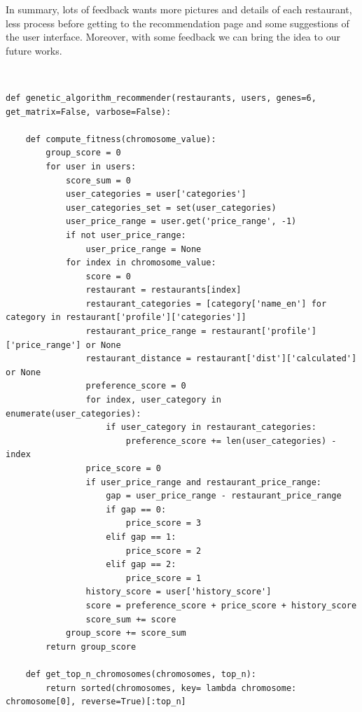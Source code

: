 \documentclass[12pt,oneside,openright,a4paper]{cpe-english-project}
\begin{document}
In summary, lots of feedback wants more pictures and details of each restaurant, less process before getting to the recommendation page and some suggestions of the user interface. Moreover, with some feedback we can bring the idea to our future works.


 \\

\begin{lstlisting}
def genetic_algorithm_recommender(restaurants, users, genes=6, get_matrix=False, varbose=False):

    def compute_fitness(chromosome_value):
        group_score = 0
        for user in users:
            score_sum = 0
            user_categories = user['categories']
            user_categories_set = set(user_categories)
            user_price_range = user.get('price_range', -1)
            if not user_price_range:
                user_price_range = None
            for index in chromosome_value:
                score = 0
                restaurant = restaurants[index]
                restaurant_categories = [category['name_en'] for category in restaurant['profile']['categories']]
                restaurant_price_range = restaurant['profile']['price_range'] or None
                restaurant_distance = restaurant['dist']['calculated'] or None
                preference_score = 0
                for index, user_category in enumerate(user_categories):
                    if user_category in restaurant_categories:
                        preference_score += len(user_categories) - index
                price_score = 0
                if user_price_range and restaurant_price_range:
                    gap = user_price_range - restaurant_price_range
                    if gap == 0:
                        price_score = 3
                    elif gap == 1:
                        price_score = 2
                    elif gap == 2:
                        price_score = 1
                history_score = user['history_score']
                score = preference_score + price_score + history_score
                score_sum += score
            group_score += score_sum
        return group_score

    def get_top_n_chromosomes(chromosomes, top_n):
        return sorted(chromosomes, key= lambda chromosome: chromosome[0], reverse=True)[:top_n]


\end{lstlisting}
\end{document}
